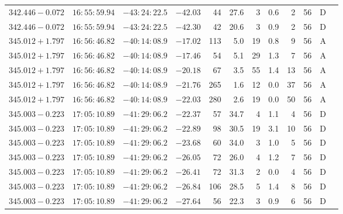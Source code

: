 {\begin{longtable}{c rrr rrrrr rr c}
    $342.446-0.072$     &   $16:55:59.94$     &   $-43:24:22.5$     &   $-42.03  $    &   44     &   27.6    &    3   &   0.6 &   2   &   56  &   D   \\
    $342.446-0.072$     &   $16:55:59.94$     &   $-43:24:22.5$     &   $-42.30  $    &   42     &   20.6    &    3   &   0.9 &   2   &   56  &   D   \\
    $345.012+1.797$     &   $16:56:46.82$     &   $-40:14:08.9$     &   $-17.02  $    &   113    &    5.0    &    19  &   0.8 &   9   &   56  &   A   \\
    $345.012+1.797$     &   $16:56:46.82$     &   $-40:14:08.9$     &   $-17.46  $    &   54     &    5.1    &    29  &   1.3 &   7   &   56  &   A   \\
    $345.012+1.797$     &   $16:56:46.82$     &   $-40:14:08.9$     &   $-20.18  $    &   67     &    3.5    &    55  &   1.4 &   13  &   56  &   A   \\
    $345.012+1.797$     &   $16:56:46.82$     &   $-40:14:08.9$     &   $-21.76  $    &   265    &    1.6    &    12  &   0.0 &   37  &   56  &   A   \\
    $345.012+1.797$     &   $16:56:46.82$     &   $-40:14:08.9$     &   $-22.03  $    &   280    &    2.6    &    19  &   0.0 &   50  &   56  &   A   \\
    $345.003-0.223$     &   $17:05:10.89$     &   $-41:29:06.2$     &   $-22.37  $    &   57     &   34.7    &    4   &   1.1 &   4   &   56  &   D   \\
    $345.003-0.223$     &   $17:05:10.89$     &   $-41:29:06.2$     &   $-22.89  $    &   98     &   30.5    &    19  &   3.1 &   10  &   56  &   D   \\
    $345.003-0.223$     &   $17:05:10.89$     &   $-41:29:06.2$     &   $-23.68  $    &   60     &   34.0    &    3   &   1.0 &   5   &   56  &   D   \\
    $345.003-0.223$     &   $17:05:10.89$     &   $-41:29:06.2$     &   $-26.05  $    &   72     &   26.0    &    4   &   1.2 &   7   &   56  &   D   \\
    $345.003-0.223$     &   $17:05:10.89$     &   $-41:29:06.2$     &   $-26.41  $    &   72     &   31.3    &    2   &   0.0 &   4   &   56  &   D   \\
    $345.003-0.223$     &   $17:05:10.89$     &   $-41:29:06.2$     &   $-26.84  $    &   106    &   28.5    &    5   &   1.4 &   8   &   56  &   D   \\
    $345.003-0.223$     &   $17:05:10.89$     &   $-41:29:06.2$     &   $-27.64  $    &   56     &   22.3    &    3   &   0.9 &   6   &   56  &   D   \\

\end{longtable}}
